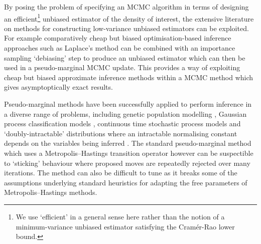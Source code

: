 By posing the problem of specifying an \ac{MCMC} algorithm in terms of designing an efficient\footnote{We use `efficient' in a general sense here rather than the notion of a minimum-variance unbiased estimator satisfying the Cram\'{e}r-Rao lower bound.} unbiased estimator of the density of interest, the extensive literature on methods for constructing low-variance unbiased estimators can be exploited. For example comparatively cheap but biased optimisation-based inference approaches such as Laplace's method can be combined with an importance sampling `debiasing' step to produce an unbiased estimator which can then be used in a pseudo-marginal \ac{MCMC} update. This provides a way of exploiting cheap but biased approximate inference methods within a \ac{MCMC} method which gives asymptoptically exact results.

Pseudo-marginal methods have been successfully applied to perform inference in a diverse range of problems, including genetic population modelling \citep{beaumont2003estimation}, Gaussian process classification models \citep{filippone2014pseudo}, continuous time stochastic process models \citep{georgoulas2015unbiased} and `doubly-intractable' distributions where an intractable normalising constant depends on the variables being inferred \cite{murray2006mcmc,moller2006efficient,lyne2015russian}. The standard pseudo-marginal method which uses a Metropolis--Hastings transition operator however can be suspectible to `sticking' behaviour where proposed moves are repeatedly rejected over many iterations. The method can also be difficult to tune as it breaks some of the assumptions underlying standard heuristics for adapting the free parameters of Metropolis--Hastings methods.



